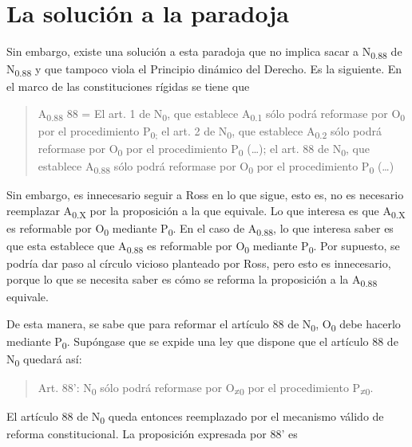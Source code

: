 \documentclass[]{book}
\begin{document}
\section*{La solución a la paradoja}

Sin embargo, existe una solución a esta paradoja que no implica sacar a
N\textsubscript{0.88} de N\textsubscript{0.88} y que tampoco viola el Principio dinámico del Derecho. Es la siguiente. En el marco de las
constituciones rígidas se tiene que

\begin{quote}
A\textsubscript{0.88} 88 = El art. 1 de N\textsubscript{0}, que
establece A\textsubscript{0.1} sólo podrá reformase por
O\textsubscript{0} por el procedimiento P\textsubscript{0;} el art. 2 de
N\textsubscript{0}, que establece A\textsubscript{0.2} sólo podrá
reformase por O\textsubscript{0} por el procedimiento P\textsubscript{0}
(\ldots{}); el art. 88 de N\textsubscript{0}, que establece
A\textsubscript{0.88} sólo podrá reformase por O\textsubscript{0} por el
procedimiento P\textsubscript{0} (\ldots{})
\end{quote}

Sin embargo, es innecesario seguir a Ross en lo que sigue, esto es, no
es necesario reemplazar A\textsubscript{0.X} por la proposición a la que
equivale. Lo que interesa es que A\textsubscript{0.X} es reformable por
O\textsubscript{0} mediante P\textsubscript{0}. En el caso de
A\textsubscript{0.88}, lo que interesa saber es que esta establece que
A\textsubscript{0.88} es reformable por O\textsubscript{0} mediante
P\textsubscript{0}. Por supuesto, se podría dar paso al círculo vicioso
planteado por Ross, pero esto es innecesario, porque lo que se necesita
saber es cómo se reforma la proposición a la A\textsubscript{0.88}
equivale.

De esta manera, se sabe que para reformar el artículo 88 de
N\textsubscript{0}, O\textsubscript{0} debe hacerlo mediante
P\textsubscript{0}. Supóngase que se expide una ley que dispone que el
artículo 88 de N\textsubscript{0} quedará así:

\begin{quote}
Art. 88': N\textsubscript{0} sólo podrá reformase por
O\textsubscript{≠0} por el procedimiento P\textsubscript{≠0}.
\end{quote}

El artículo 88 de N\textsubscript{0} queda entonces reemplazado por el
mecanismo válido de reforma constitucional. La proposición expresada por
88' es
\end{document}
